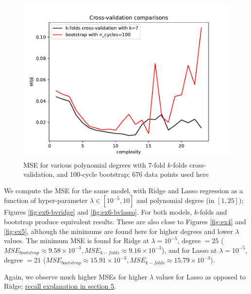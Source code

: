 \documentclass[10pt, a4paper]{article}
\begin{document}
    \begin{figure}[h] %
        \centering
        \includegraphics[scale=0.55]{ex6_bv_bootstrap_cv_comp.pdf}
        \caption{MSE for various polynomial degrees with 7-fold $k$-folds cross-validation, and 100-cycle bootstrap; 676 data points used here}
        \label{fig:ex6-bvols}
    \end{figure}
    
    We compute the MSE for the same model, with Ridge and Lasso regression as a function of hyper-parameter $\lambda \in [10^{-5}, 10]$ and polynomial degree (in $[1, 25]$); Figures \ref{fig:ex6-bvridge} and \ref{fig:ex6-bvlasso}. For both models, $k$-folds and bootstrap produce equivalent results. These are also close to Figures \ref{fig:ex4} and \ref{fig:ex5}, although the minimums are found here for higher degrees and lower $\lambda$ values. The minimum MSE is found for Ridge at $\lambda = 10^{-5}$, degree $= 25$ ($MSE_{bootstrap} \approx 9.58 \times 10^{-3}, MSE_{k-folds} \approx 9.16 \times 10^{-3}$), and for Lasso at $\lambda = 10^{-5}$, degree $= 21$ ($MSE_{bootstrap} \approx 15.91 \times 10^{-3}, MSE_{k-folds} \approx 15.79 \times 10^{-3}$).
    
    Again, we observe much higher MSEs for higher $\lambda$ values for Lasso as opposed to Ridge; \hyperlink{ridgevlasso}{recall explanation in section 5}.
    
\end{document}
